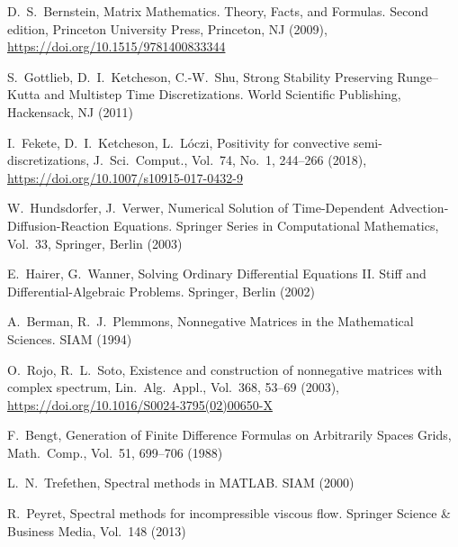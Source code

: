 \documentclass[a4paper]{article}
\begin{document}




\begin{thebibliography}{99}

D.~S.~Bernstein, Matrix Mathematics. Theory, Facts, and Formulas. Second edition, Princeton University Press, Princeton, NJ (2009), \href{https://doi.org/10.1515/9781400833344}{https://doi.org/10.1515/9781400833344}

{S.~Gottlieb,  D.~I.~Ketcheson,  C.-W.~Shu}, {Strong Stability Preserving {R}unge--{K}utta and Multistep Time Discretizations}. {World Scientific Publishing, Hackensack, NJ} ({2011})

I.~Fekete, D.~I.~Ketcheson, L.~L\'oczi, Positivity for convective semi-discretizations, J.~Sci.~Comput., Vol.~74, No.~1, 244--266 (2018), \href{https://doi.org/10.1007/s10915-017-0432-9}{https://doi.org/10.1007/s10915-017-0432-9}


W.~Hundsdorfer, J.~Verwer, Numerical Solution of Time-Dependent Advection-Diffusion-Reaction
Equations. Springer Series in Computational Mathematics, Vol.~33, Springer, Berlin (2003)    

E.~Hairer, G.~Wanner, Solving Ordinary Differential Equations II. Stiff
and Differential-Algebraic Problems. Springer, Berlin (2002)

 A.~Berman, R.~J.~Plemmons, Nonnegative Matrices in the Mathematical Sciences. SIAM (1994)
 
O.~Rojo, R.~L.~Soto, Existence and construction of nonnegative matrices with complex spectrum, 
Lin.~Alg.~Appl., Vol.~368, 53--69 (2003), \href{https://doi.org/10.1016/S0024-3795(02)00650-X}{https://doi.org/10.1016/S0024-3795(02)00650-X}

F.~Bengt, Generation of Finite Difference Formulas on Arbitrarily Spaces Grids, Math.~Comp., Vol.~51, 699--706 (1988)

L.~N.~Trefethen, Spectral methods in MATLAB. SIAM (2000)

R.~Peyret, Spectral methods for incompressible viscous flow. Springer Science \& Business Media, Vol.~148 
(2013)

\end{thebibliography}
\end{document}
